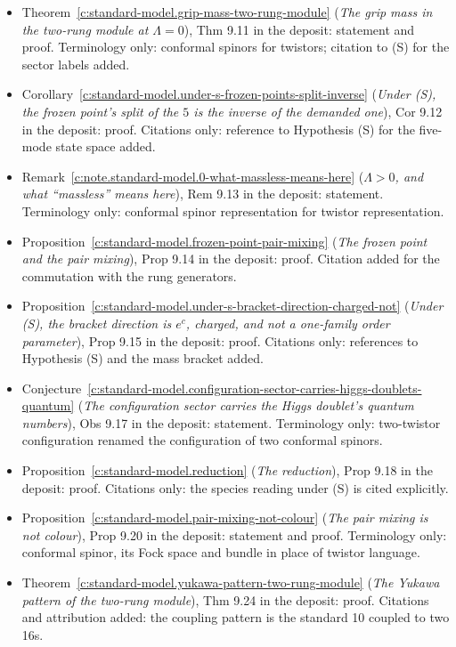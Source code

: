 \documentclass[11pt]{article}
\theoremstyle{definition}
\theoremstyle{plain}
\begin{document}
\begin{itemize}
\item Theorem~\ref{c:standard-model.grip-mass-two-rung-module} (\emph{The grip mass in the two-rung module at $\Lambda = 0$}), Thm 9.11 in the deposit: statement and proof. Terminology only: conformal spinors for twistors; citation to (S) for the sector labels added.
\item Corollary~\ref{c:standard-model.under-s-frozen-points-split-inverse} (\emph{Under (S), the frozen point's split of the $5$ is the inverse of the demanded one}), Cor 9.12 in the deposit: proof. Citations only: reference to Hypothesis (S) for the five-mode state space added.
\item Remark~\ref{c:note.standard-model.0-what-massless-means-here} (\emph{$\Lambda > 0$, and what ``massless'' means here}), Rem 9.13 in the deposit: statement. Terminology only: conformal spinor representation for twistor representation.
\item Proposition~\ref{c:standard-model.frozen-point-pair-mixing} (\emph{The frozen point and the pair mixing}), Prop 9.14 in the deposit: proof. Citation added for the commutation with the rung generators.
\item Proposition~\ref{c:standard-model.under-s-bracket-direction-charged-not} (\emph{Under (S), the bracket direction is $e^{c}$, charged, and not a one-family order parameter}), Prop 9.15 in the deposit: proof. Citations only: references to Hypothesis (S) and the mass bracket added.
\item Conjecture~\ref{c:standard-model.configuration-sector-carries-higgs-doublets-quantum} (\emph{The configuration sector carries the Higgs doublet's quantum numbers}), Obs 9.17 in the deposit: statement. Terminology only: two-twistor configuration renamed the configuration of two conformal spinors.
\item Proposition~\ref{c:standard-model.reduction} (\emph{The reduction}), Prop 9.18 in the deposit: proof. Citations only: the species reading under (S) is cited explicitly.
\item Proposition~\ref{c:standard-model.pair-mixing-not-colour} (\emph{The pair mixing is not colour}), Prop 9.20 in the deposit: statement and proof. Terminology only: conformal spinor, its Fock space and bundle in place of twistor language.
\item Theorem~\ref{c:standard-model.yukawa-pattern-two-rung-module} (\emph{The Yukawa pattern of the two-rung module}), Thm 9.24 in the deposit: proof. Citations and attribution added: the coupling pattern is the standard 10 coupled to two 16s.

\end{itemize}
\end{document}
